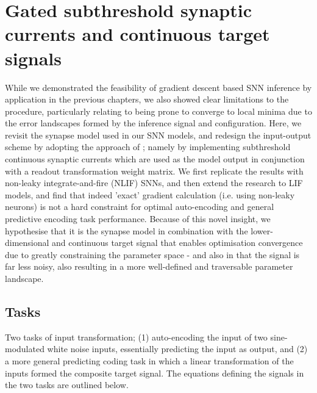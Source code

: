 \documentclass[mphil,deptreport,ianc]{infthesis} %
\begin{document}
\chapter{Gated subthreshold synaptic currents and continuous target signals}\label{chpt:gated_synaptic}

While we demonstrated the feasibility of gradient descent based SNN inference by application in the previous chapters, we also showed clear limitations to the procedure, particularly relating to being prone to converge to local minima due to the error landscapes formed by the inference signal and configuration.
Here, we revisit the synapse model used in our SNN models, and redesign the input-output scheme by adopting the approach of \cite{Huh2017}; namely by implementing subthreshold continuous synaptic currents which are used as the model output in conjunction with a readout transformation weight matrix.
We first replicate the results with non-leaky integrate-and-fire (NLIF) SNNs, and then extend the research to LIF models, and find that indeed 'exact' gradient calculation (i.e. using non-leaky neurons) is not a hard constraint for optimal auto-encoding and general predictive encoding task performance.
Because of this novel insight, we hypothesise that it is the synapse model in combination with the lower-dimensional and continuous target signal that enables optimisation convergence due to greatly constraining the parameter space - and also in that the signal is far less noisy, also resulting in a more well-defined and traversable parameter landscape.


\section{Tasks}

Two tasks of input transformation; (1) auto-encoding the input of two sine-modulated white noise inputs, essentially predicting the input as output, and (2) a more general predicting coding task in which a linear transformation of the inputs formed the composite target signal. The equations defining the signals in the two tasks are outlined below.
\end{document}
